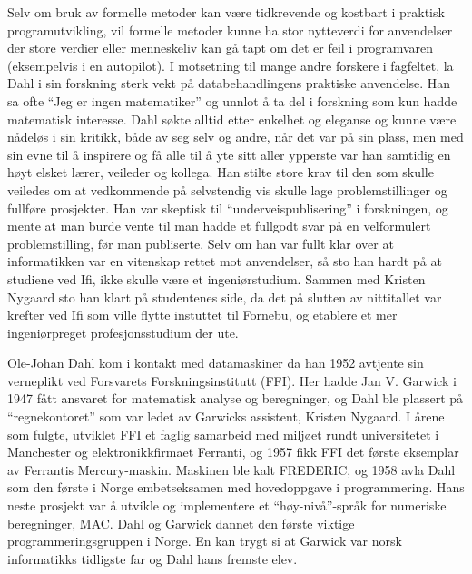 Selv om bruk av formelle metoder kan være tidkrevende og kostbart i praktisk programutvikling, vil formelle metoder kunne ha stor nytteverdi for anvendelser der store verdier eller menneskeliv kan gå tapt om det er feil i programvaren (eksempelvis i en autopilot). I motsetning til mange andre forskere i fagfeltet, la Dahl i sin forskning sterk vekt på databehandlingens praktiske anvendelse. Han sa ofte ``Jeg er ingen matematiker'' og unnlot å ta del i forskning som kun hadde matematisk interesse. Dahl søkte alltid etter enkelhet og eleganse og kunne være nådeløs i sin kritikk, både av seg selv og andre, når det var på sin plass, men med sin evne til å inspirere og få alle til å yte sitt aller ypperste var han samtidig en høyt elsket lærer, veileder og kollega. Han stilte store krav til den som skulle veiledes om at vedkommende på selvstendig vis skulle lage problemstillinger og fullføre prosjekter. Han var skeptisk til ``underveispublisering'' i forskningen, og mente at man burde vente til man hadde et fullgodt svar på en velformulert problemstilling, før man publiserte. Selv om han var fullt klar over at informatikken var en vitenskap rettet mot anvendelser, så sto han hardt på at studiene ved Ifi, ikke skulle være et ingeniørstudium. Sammen med Kristen Nygaard sto han klart på studentenes side, da det på slutten av nittitallet var krefter ved Ifi som ville flytte instuttet til Fornebu, og etablere et mer ingeniørpreget profesjonsstudium der ute.

Ole-Johan Dahl kom i kontakt med datamaskiner da han 1952 avtjente sin verneplikt ved Forsvarets Forskningsinstitutt (FFI). Her hadde Jan V. Garwick i 1947 fått ansvaret for matematisk analyse og beregninger, og Dahl ble plassert på ``regnekontoret'' som var ledet av Garwicks assistent, Kristen Nygaard. I årene som fulgte, utviklet FFI et faglig samarbeid med miljøet rundt universitetet i Manchester og elektronikkfirmaet Ferranti, og 1957 fikk FFI det første eksemplar av Ferrantis Mercury-maskin. Maskinen ble kalt FREDERIC, og 1958 avla Dahl som den første i Norge embetseksamen med hovedoppgave i programmering. Hans neste prosjekt var å utvikle og implementere et ``høy-nivå''-språk for numeriske beregninger, MAC. Dahl og Garwick dannet den første viktige programmeringsgruppen i Norge. En kan trygt si at Garwick var norsk informatikks tidligste far og Dahl hans fremste elev.

